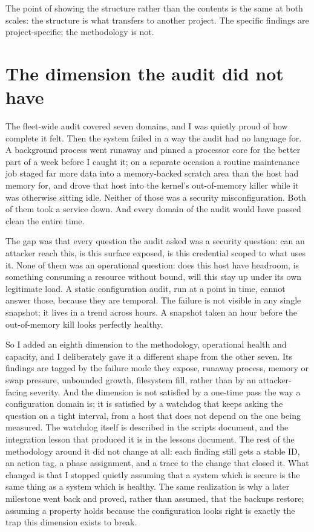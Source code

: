 \documentclass[12pt]{article}
\begin{document}
The point of showing the structure rather than the contents is the same at both scales: the structure is what transfers to another project. The specific findings are project-specific; the methodology is not.

\section{The dimension the audit did not have}

The fleet-wide audit covered seven domains, and I was quietly proud of how complete it felt. Then the system failed in a way the audit had no language for. A background process went runaway and pinned a processor core for the better part of a week before I caught it; on a separate occasion a routine maintenance job staged far more data into a memory-backed scratch area than the host had memory for, and drove that host into the kernel's out-of-memory killer while it was otherwise sitting idle. Neither of those was a security misconfiguration. Both of them took a service down. And every domain of the audit would have passed clean the entire time.

The gap was that every question the audit asked was a security question: can an attacker reach this, is this surface exposed, is this credential scoped to what uses it. None of them was an operational question: does this host have headroom, is something consuming a resource without bound, will this stay up under its own legitimate load. A static configuration audit, run at a point in time, cannot answer those, because they are temporal. The failure is not visible in any single snapshot; it lives in a trend across hours. A snapshot taken an hour before the out-of-memory kill looks perfectly healthy.

So I added an eighth dimension to the methodology, operational health and capacity, and I deliberately gave it a different shape from the other seven. Its findings are tagged by the failure mode they expose, runaway process, memory or swap pressure, unbounded growth, filesystem fill, rather than by an attacker-facing severity. And the dimension is not satisfied by a one-time pass the way a configuration domain is; it is satisfied by a watchdog that keeps asking the question on a tight interval, from a host that does not depend on the one being measured. The watchdog itself is described in the scripts document, and the integration lesson that produced it is in the lessons document. The rest of the methodology around it did not change at all: each finding still gets a stable ID, an action tag, a phase assignment, and a trace to the change that closed it. What changed is that I stopped quietly assuming that a system which is secure is the same thing as a system which is healthy. The same realization is why a later milestone went back and proved, rather than assumed, that the backups restore; assuming a property holds because the configuration looks right is exactly the trap this dimension exists to break.
\end{document}
